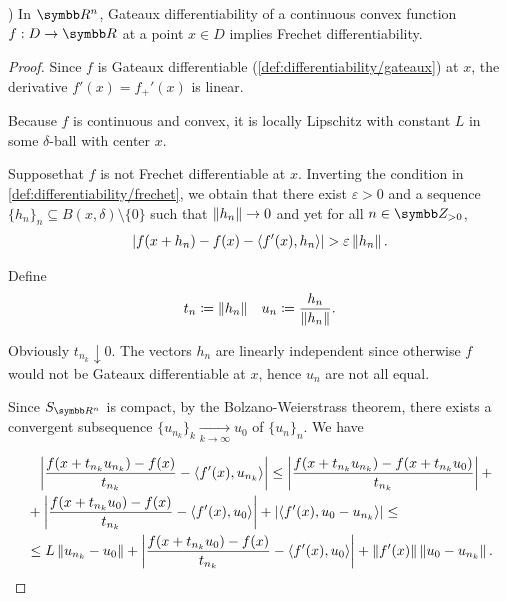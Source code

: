 \begin{theorem}\label{thm:rn_continuous_convex_gateaux_implies_frechet}\cite[exercise 1.15(a]{Phelps1993})
  In \( \R^n \), Gateaux differentiability of a continuous convex function \( f: D \to \R \) at a point \( x \in D \) implies Frechet differentiability.
\end{theorem}
\begin{proof}
  Since \( f \) is Gateaux differentiable (\cref{def:differentiability/gateaux}) at \( x \), the derivative \( f'(x) = f_+'(x) \) is linear.

  Because \( f \) is continuous and convex, it is locally Lipschitz with constant \( L \) in some \( \delta \)-ball with center \( x \).

  Suppose\LEM that \( f \) is not Frechet differentiable at \( x \). Inverting the condition in \cref{def:differentiability/frechet}, we obtain that there exist \( \varepsilon > 0 \) and a sequence \( \{ h_n \}_n \subseteq B(x, \delta) \setminus \{ 0 \} \) such that \( \left\Vert h_n \right\Vert \to 0 \) and yet for all \( n \in \Z_{>0} \),
  \begin{align}\label{thm:rn_continuous_convex_gateaux_implies_frechet/frechet_assumption}
    \left\vert f(x + h_n) - f(x) - \left\langle f'(x), h_n \right\rangle \right\vert > \varepsilon \left\Vert h_n \right\Vert.
  \end{align}

  Define
  \begin{align*}
    t_n \coloneqq \left\Vert h_n \right\Vert
    &&
    u_n \coloneqq \frac{h_n} {\left\Vert h_n \right\Vert}.
  \end{align*}

  Obviously \( t_{n_k} \downarrow 0 \). The vectors \( h_n \) are linearly independent since otherwise \( f \) would not be Gateaux differentiable at \( x \), hence \( u_n \) are not all equal.

  Since \( S_{\R^n} \) is compact\USC, by the Bolzano-Weierstrass theorem, there exists a convergent subsequence \( \{ u_{n_k} \}_k \underset {k \to \infty} \to u_0 \) of \( \{ u_n \}_n \). We have

  \begin{align}\label{thm:rn_continuous_convex_gateaux_implies_frechet/frechet_estimate}
    &\phantom= \Abs{\frac {f(x + t_{n_k} u_{n_k}) - f(x)} {t_{n_k}} - \Prod{f'(x)} {u_{n_k}}}
    \leq \nonumber
    \Abs{\frac {f(x + t_{n_k} u_{n_k}) - f(x + t_{n_k} u_0)} {t_{n_k}}} + \\ &+ \Abs{\frac {f(x + t_{n_k} u_0) - f(x)} {t_{n_k}} - \Prod{f'(x)} {u_0}} + \Abs{\Prod{f'(x)} {u_0 - u_{n_k}}}
    \leq \nonumber \\ &\leq
    L \Norm{u_{n_k} - u_0} + \Abs{\frac {f(x + t_{n_k} u_0) - f(x)} {t_{n_k}} - \Prod{f'(x)} {u_0}} + \Norm{f'(x)} \Norm{u_0 - u_{n_k}}.
  \end{align}


\end{proof}
